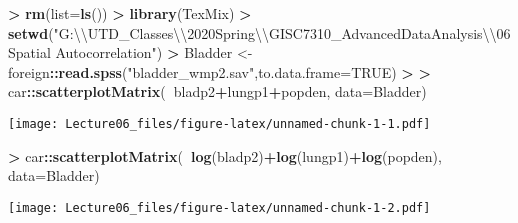 \documentclass[
]{article}
\newenvironment{Shaded}{\begin{snugshade}}{\end{snugshade}}
\newcommand{\CharTok}[1]{\textcolor[rgb]{0.31,0.60,0.02}{#1}}
\newcommand{\DataTypeTok}[1]{\textcolor[rgb]{0.13,0.29,0.53}{#1}}
\newcommand{\DecValTok}[1]{\textcolor[rgb]{0.00,0.00,0.81}{#1}}
\newcommand{\ErrorTok}[1]{\textcolor[rgb]{0.64,0.00,0.00}{\textbf{#1}}}
\newcommand{\KeywordTok}[1]{\textcolor[rgb]{0.13,0.29,0.53}{\textbf{#1}}}
\newcommand{\NormalTok}[1]{#1}
\newcommand{\OperatorTok}[1]{\textcolor[rgb]{0.81,0.36,0.00}{\textbf{#1}}}
\newcommand{\OtherTok}[1]{\textcolor[rgb]{0.56,0.35,0.01}{#1}}
\newcommand{\StringTok}[1]{\textcolor[rgb]{0.31,0.60,0.02}{#1}}
\begin{document}
\begin{Shaded}
\begin{Highlighting}[]
\OperatorTok{>}\StringTok{ }\KeywordTok{rm}\NormalTok{(}\DataTypeTok{list=}\KeywordTok{ls}\NormalTok{())}
\OperatorTok{>}\StringTok{ }\KeywordTok{library}\NormalTok{(TexMix)}
\OperatorTok{>}\StringTok{ }\KeywordTok{setwd}\NormalTok{(}\StringTok{"G:}\CharTok{\textbackslash{}\textbackslash{}}\StringTok{UTD_Classes}\CharTok{\textbackslash{}\textbackslash{}}\StringTok{2020Spring}\CharTok{\textbackslash{}\textbackslash{}}\StringTok{GISC7310_AdvancedDataAnalysis}\CharTok{\textbackslash{}\textbackslash{}}\StringTok{06Spatial Autocorrelation"}\NormalTok{)}
\OperatorTok{>}\StringTok{ }\NormalTok{Bladder <-}\StringTok{ }\NormalTok{foreign}\OperatorTok{::}\KeywordTok{read.spss}\NormalTok{(}\StringTok{"bladder_wmp2.sav"}\NormalTok{,}\DataTypeTok{to.data.frame=}\OtherTok{TRUE}\NormalTok{)}
\OperatorTok{>}\StringTok{ }
\ErrorTok{>}\StringTok{ }\NormalTok{car}\OperatorTok{::}\KeywordTok{scatterplotMatrix}\NormalTok{(}\OperatorTok{~}\NormalTok{bladp2}\OperatorTok{+}\NormalTok{lungp1}\OperatorTok{+}\NormalTok{popden, }\DataTypeTok{data=}\NormalTok{Bladder)}
\end{Highlighting}
\end{Shaded}

\texttt{[image: Lecture06\_files/figure-latex/unnamed-chunk-1-1.pdf]}

\begin{Shaded}
\begin{Highlighting}[]
\OperatorTok{>}\StringTok{ }\NormalTok{car}\OperatorTok{::}\KeywordTok{scatterplotMatrix}\NormalTok{(}\OperatorTok{~}\KeywordTok{log}\NormalTok{(bladp2)}\OperatorTok{+}\KeywordTok{log}\NormalTok{(lungp1)}\OperatorTok{+}\KeywordTok{log}\NormalTok{(popden), }\DataTypeTok{data=}\NormalTok{Bladder)}
\end{Highlighting}
\end{Shaded}

\texttt{[image: Lecture06\_files/figure-latex/unnamed-chunk-1-2.pdf]}

\begin{Shaded}
\end{Shaded}
\end{document}
